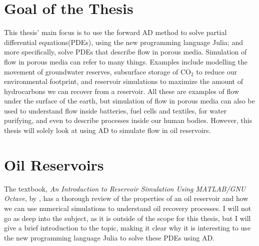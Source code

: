 \section{Goal of the Thesis}
This thesis' main focus is to use the forward AD method to solve partial differential equations(PDEs), using the new programming language Julia; and more specifically, solve PDEs that describe flow in porous media. Simulation of flow in porous media can refer to many things. Examples include modelling the movement of groundwater reserves, subsurface storage of CO$_2$ to reduce our environmental footprint, and reservoir simulations to maximize the amount of hydrocarbons we can recover from a reservoir. All these are examples of flow under the surface of the earth, but simulation of flow in porous media can also be used to understand flow inside batteries, fuel cells and textiles, for water purifying, and even to describe processes inside our human bodies. However, this thesis will solely look at using AD to simulate flow in oil reservoirs.

\section{Oil Reservoirs}
\label{sec:OilReservoirs}
The textbook, \textit{An Introduction to Reservoir Simulation Using MATLAB/GNU Octave}, by \emph{\citet{lieMrstUrl}}, has a thorough review of the properties of an oil reservoir and how we can use numerical simulations to understand oil recovery processes. I will not go as deep into the subject, as it is outside of the scope for this thesis, but I will give a brief introduction to the topic, making it clear why it is interesting to use the new programming language Julia to solve these PDEs using AD.

